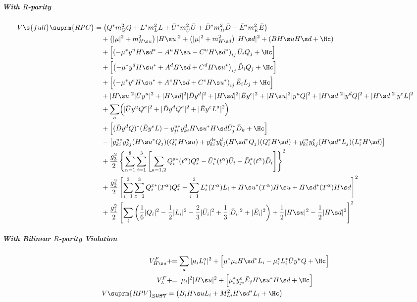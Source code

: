 \subparagraph{With $R$-parity}
\begin{align}\label{eq:ScaPoteFullRPC}
\begin{split}
 V\s{full}\suprm{RPC}&=
\left(Q^*m_Q^2Q+L^*m_L^2L+\bU^* m_\bU^2\bU + \bD^* m_\bD^2\bD + \bE^* m_\bE^2\bE\right)
\\&\quad
+\left(|\mu|^2 + m^2_{\Hu} \right) |\Hu|^2 + \left(|\mu|^2+m^2_{\Hd}\right)|\Hd|^2
+\left( B\Hu\Hd+\Hc\right)
\\&\quad
+\left[\left(-\mu^*y^u\Hd^*-A^u\Hu-C^u\Hd^*\right)_{ij}\bU_iQ_j+\Hc\right]
\\&\quad
+\left[\left(-\mu^*y^d\Hu^*+A^d\Hd+C^d\Hu^*\right)_{ij}\bD_iQ_j+\Hc\right]
\\&\quad
+\left[\left(-\mu^*y^e\Hu^*+A^e\Hd+C^e\Hu^*\right)_{ij}\bE_iL_j+\Hc\right]
\\&\quad
 + |\Hu|^2|\bU y^u|^2 +|\Hd|^2|\bD y^d|^2 +|\Hd|^2|\bE y^e|^2
 + |\Hu|^2|y^uQ|^2 + |\Hd|^2|y^dQ|^2 + |\Hd|^2|y^eL|^2
\\&\quad
  + \sum_a\Bigl(|\bU y^u Q^a|^2 + |\bD y^dQ^a|^2+|\bE y^eL^a|^2\Bigr)
\\&\quad
+\Bigl[(\bD y^d Q)^*(\bE y^e L) - y^{u*}_{ji}y^d_{ki} \Hu^*\Hd\bU_j^*\bD_k +\Hc\Bigr]
\\&\quad
-\left[
 y^{u*}_{ki}y^u_{kj}(H\s u^* Q_j)(Q_i^* \Hu)
+y^{d*}_{ki}y^d_{kj}(H\s d^* Q_j)(Q_i^* \Hd)
+y^{e*}_{ki}y^e_{kj}(H\s d^* L_j)(L_i^* \Hd)
\right]
\\&\quad
+\frac{g_3^2}2\left\{
 \sum_{\alpha=1}^8\sum_{i=1}^3\left[
  \sum_{a=1,2}Q_i^{a*}(t^\alpha)Q_i^{a}
- \bU_i^{*}(t^\alpha)\bU_i
- \bD_i^{*}(t^\alpha)\bD_i
\right]\right\}^2
\\&\quad
+\frac{g_2^2}2
 \left[
  \sum_{i=1}^3\sum_{x=1}^3 Q_i^{x*}(T^\alpha)Q_i^{x}
+ \sum_{i=1}^3 L_i^{*}(T^\alpha) L_i
+ \Hu^{*}(T^\alpha)\Hu
+ \Hd^{*}(T^\alpha)\Hd
\right]^2
\\&\quad
+\frac{g_1^2}2\left[
  \sum_i\left(\frac16|  Q_i |^2
- \frac12|  L_i |^2
- \frac23|\bU_i |^2
+ \frac13|\bD_i |^2
+        |\bE_i |^2\right)
+ \frac12|\Hu   |^2
- \frac12|\Hd   |^2
\right]^2
\end{split}
\end{align}

\subparagraph{With Bilinear $R$-parity Violation}
\begin{align}
 V^F_{\Hu} &  +\!\! = \sum_a|\mu_iL_i^a|^2 + \Bigl[\mu^*\mu_i\Hd^*L_i - \mu_i^*L_i^*\bU y^u Q + \Hc \Bigr]\\
 V^F_{L}   &  +\!\! = |\mu_i|^2|\Hu|^2 + \Bigl[\mu_i^*y^e_{ji}\bE_j\Hu^*\Hd+\Hc\Bigr]\\
V\suprm{RPV}_{\text{\cancel{SUSY}}}&= \left(B_i\Hu L_i + M^2_{Li}\Hd^*L_i + \Hc\right)
\end{align}

